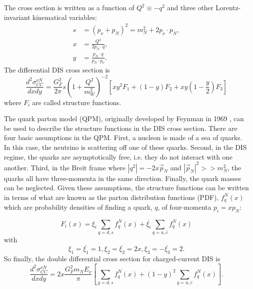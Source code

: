 The cross section is written \cite{GKbook} as a function of $Q^2\equiv -q^2$ and three other Lorentz-invariant kinematical variables: 
\begin{align}
s &= (p_\nu+p_N)^2 = m_N^2+2p_\nu\cdot p_N, \\
x &= \frac{Q^2}{2p_N\cdot q},\\
y &= \frac{p_N\cdot q}{p_N\cdot p_\nu}.
\end{align}
The differential DIS cross section is
\begin{equation}
\frac{d^2\sigma^{\nu N}_{CC}}{dx dy} = \frac{G_F^2}{2\pi}s \left(1+\frac{Q^2}{m_W^2}\right)^{-2}\left[x y^2 F_1 + (1-y)F_2 + xy\left(1-\frac{y}{2}\right)F_3 \right]
\end{equation}
where $F_i$ are called structure functions.

The quark parton model (QPM), originally developed by Feynman in 1969 \cite{QPM}, can be used to describe the structure functions in the DIS cross section. There are four basic assumptions in the QPM. First, a nucleon is made of a sea of quarks. 
In this case, the neutrino is scattering off one of these quarks. Second, in the DIS regime, the quarks are asymptotically free, i.e. they do not interact with one another. Third, in the Breit frame where $|q^2| = -2 x \vec{p}_N$ and $|\vec{p}_N|^2 >> m_N^2$, the quarks all have three-momenta in the same direction. Finally, the quark masses can be neglected. Given these assumptions, the structure functions can be written in terms of what are known as the parton distribution functions (PDF), $f_q^N(x)$ which are probability densities of finding a quark, $q$, of four-momenta $p_i=x p_N$:

\begin{equation}
F_i(x) = \xi_i \sum_{q=d,s} f^N_q(x)+\overline{\xi_i} \sum_{\overline{q}=\overline{u},\overline{c}} f_{\overline{q}}^N(x)
\end{equation}
with
\begin{equation}
\xi_1 = \overline{\xi_1} = 1, \xi_2=\overline{\xi_2}=2x, \xi_3=-\overline{\xi_3}=2.
\end{equation}
So finally, the double differential cross section for charged-current DIS is
\begin{equation}
\frac{d^2\sigma^{\nu N}_{CC}}{dx dy} = 2x \frac{G_F^2 m_N E_\nu}{\pi}\left[\sum_{q=d,s} f^N_q(x)+(1-y)^2 \sum_{\overline{q}=\overline{u},\overline{c}}f_{\overline{q}}^N(x)\right].
\end{equation}

